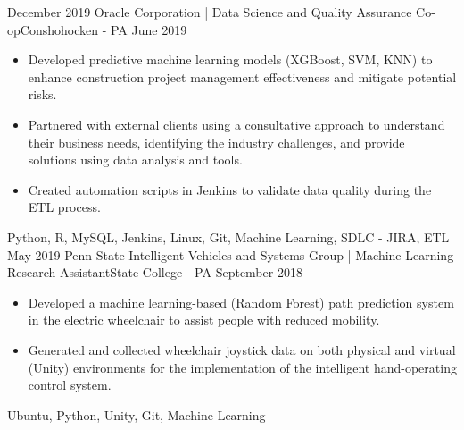 \begin{experiences}
  \experience
    {December 2019}   { Oracle Corporation | Data Science and Quality Assurance Co-op}{Conshohocken - PA}
    {June 2019} {
                      \begin{itemize}
                         \item Developed predictive machine learning models (XGBoost, SVM, KNN) to enhance construction project management effectiveness and mitigate potential risks. 
                        \item Partnered with external clients using a consultative approach to understand their business needs, identifying the industry challenges, and provide solutions using data analysis and tools. 
                         \item Created automation scripts in Jenkins to validate data quality during the ETL process. 
                                                                              
                      \end{itemize}
                    }
                    {Python, R, MySQL, Jenkins, Linux, Git, Machine Learning, SDLC - JIRA, ETL}
                    \linebreak
  \emptySeparator
  \experience
    {May 2019} {Penn State Intelligent Vehicles and Systems Group | Machine Learning Research Assistant}{State College - PA}
    {September 2018}    {
                      \begin{itemize}
                      
                        \item Developed a machine learning-based (Random Forest) path prediction system in the electric wheelchair to assist people with reduced mobility. 
                                              
                        \item Generated and collected wheelchair joystick data on both physical and virtual (Unity) environments for the implementation of the intelligent hand-operating control system.
                          
                      \end{itemize}
                    }
                    {Ubuntu, Python, Unity, Git, Machine Learning}
                    \linebreak 
                    


\end{experiences}
